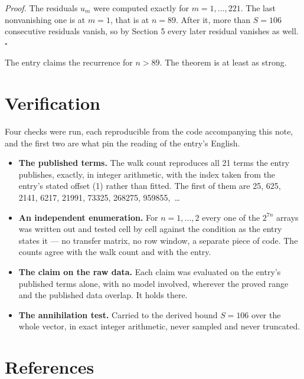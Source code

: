 \documentclass[11pt]{article}
\theoremstyle{definition}
\begin{document}
{\itshape Proof.} The residuals $u_m$ were computed exactly for $m = 1,\dots,221$. The last nonvanishing one is at $m = 1$, that is at $n = 89$. After it, more than $S = 106$ consecutive residuals vanish, so by Section 5 every later residual vanishes as well. $\square$

The entry claims the recurrence for $n > 89$. The theorem is at least as strong.

\section{Verification}

Four checks were run, each reproducible from the code accompanying this note, and the first two are what pin the reading of the entry's English.

\begin{itemize}

\item {\bfseries The published terms.} The walk count reproduces all 21 terms the entry publishes, exactly, in integer arithmetic, with the index taken from the entry's stated offset (1) rather than fitted. The first of them are 25, 625, 2141, 6217, 21991, 73325, 268275, 959855,~\dots

\item {\bfseries An independent enumeration.} For $n = 1,\dots,2$ every one of the $2^{7n}$ arrays was written out and tested cell by cell against the condition as the entry states it --- no transfer matrix, no row window, a separate piece of code. The counts agree with the walk count and with the entry.

\item {\bfseries The claim on the raw data.} Each claim was evaluated on the entry's published terms alone, with no model involved, wherever the proved range and the published data overlap. It holds there.

\item {\bfseries The annihilation test.} Carried to the derived bound $S = 106$ over the whole vector, in exact integer arithmetic, never sampled and never truncated.

\end{itemize}

\section{References}
\end{document}
